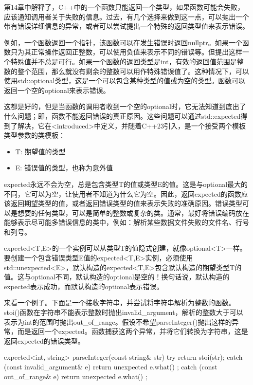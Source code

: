 
第14章中解释了，C++中的一个函数只能返回一个类型，如果函数可能会失败，应该通知调用者关于失败的信息。过去，有几个选择来做到这一点，可以抛出一个带有错误详细信息的异常，或者可以尝试提出一个特殊的返回类型值来表示错误。

例如，一个函数返回一个指针，该函数可以在发生错误时返回nullptr。如果一个函数只为其正常操作返回正整数，可以使用负值来表示不同的错误等。但提出这样一个特殊值并不总是可行。如果一个函数的返回类型是int，有效的返回值范围是整数的整个范围，那么就没有剩余的整数可以用作特殊错误值了。这种情况下，可以使用std::optional类型，这是一个可以包含某种类型的值或为空的类型。函数可以返回一个空的optional来表示错误。

这都是好的，但是当函数的调用者收到一个空的optional时，它无法知道到底出了什么问题；即，函数不能返回错误的真正原因。这些问题可以通过std::expected得到了解决，它在<introduced>中定义，并随着C++23引入，是一个接受两个模板类型参数的类模板：

\begin{itemize}
\item
T: 期望值的类型

\item
E: 错误值的类型，也称为意外值
\end{itemize}

expected永远不会为空，总是包含类型T的值或类型E的值。这是与optional最大的不同，它可以为空，让使用者不知道为什么它为空。因此，返回expected的函数应该返回期望类型的值，或者返回错误类型的值来表示失败的准确原因。错误类型可以是想要的任何类型，可以是简单的整数或复杂的类。通常，最好将错误编码放在能够表示尽可能多错误信息的类中，例如：解析某些数据文件失败的文件名、行号和列号。

expected<T,E>的一个实例可以从类型T的值隐式创建，就像optional<T>一样。要创建一个包含错误类型E值的expected<T,E>实例，必须使用std::unexpected<E>，默认构造的expected<T,E>包含默认构造的期望类型T的值。这与optional不同，默认构造的optional是空的！换句话说，默认构造的expected表示成功，而默认构造的optional表示错误。

来看一个例子。下面是一个接收字符串，并尝试将字符串解析为整数的函数。stoi()函数在字符串不能表示整数时抛出invalid\_argument，解析的整数大于可以表示为int的范围时抛出out\_of\_range。假设不希望parseInteger()抛出这样的异常，而是返回一个expected。函数捕获这两个异常，并将它们转换为字符串，这是返回expected的错误类型。

\begin{cpp}
expected<int, string> parseInteger(const string& str)
{
    try { return stoi(str); }
    catch (const invalid_argument& e) { return unexpected { e.what() }; }
    catch (const out_of_range& e) { return unexpected { e.what() }; }
}
\end{cpp}

